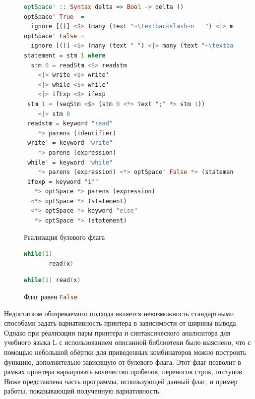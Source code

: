 \begin{figure}[ht]
\centering
\begin{lstlisting}[language=Haskell]
optSpace' :: Syntax delta => Bool -> delta ()
optSpace' True  = 
  ignore [()] <$> (many (text "~\textbackslash~n   ") <|> many (text " "))
optSpace' False = 
  ignore [()] <$> (many (text " ") <|> many (text "~\textbackslash~n"))
statement = stm 1 where
  stm 0 = readStm <$> readstm
    <|> write <$> write'
    <|> while <$> while'
    <|> ifExp <$> ifexp
 stm 1 = (seqStm <$> (stm 0 <*> text ";" *> stm 1))
    <|> stm 0
 readstm = keyword "read"
    *> parens (identifier)
 write' = keyword "write"		  
    *> parens (expression)
 while' = keyword "while"
    *> parens (expression) <*> optSpace' False *> (statement)
 ifexp = keyword "if"
   *> optSpace *> parens (expression)
  <*> optSpace *> (statement) 
  <*> optSpace *> keyword "else"  
   *> optSpace *> (statement)	
\end{lstlisting}
\caption{Реализация булевого флага}
\label{boolFlag1}

\end{figure}
\begin{figure}
  \centering
  \begin{minipage}[h]{0.4\textwidth}
    \begin{lstlisting}[language = C]
    while(1)
       read(x)
    \end{lstlisting}
    \caption{Флаг равен \lstinline[language=Haskell]{True}}
    \label{True}
  \end{minipage}
  \hfill
  \begin{minipage}[h]{0.4\textwidth}
    \begin{lstlisting}[language = C]
    while(1) read(x)
    \end{lstlisting}
    \caption{Флаг равен \lstinline[language=Haskell]{False}}
    \label{False}
  \end{minipage}
\end{figure}

Недостатком обозреваемого подхода является невозможность стандартными способами задать 
вариативность принтера в зависимости от ширины вывода. 
Однако при реализации пары принтера и синтаксического анализатора для учебного языка L с использованием
описанной библиотеки было выяснено, что с помощью небольшой обёртки для приведенных
комбинаторов можно построить функцию, дополнительно зависящую от 
булевого флага. Этот флаг позволит в рамках принтера варьировать количество пробелов, переносов строк, отступов.
Ниже представлена часть программы, использующей данный флаг, и пример работы, показывающий
полученную вариативность.


